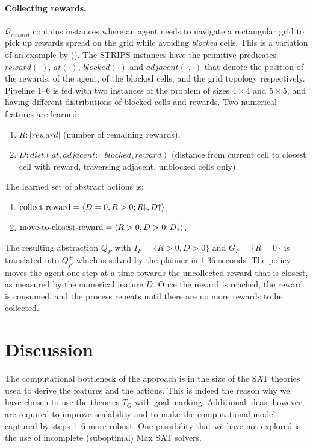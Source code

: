 \documentclass[letterpaper]{article} %
\newcommand{\tup}[1]{\langle #1 \rangle}
\newcommand{\abs}[1]{\ensuremath{\left\vert{#1}\right\vert}}
\newcommand{\citeay}[1]{\citeauthor{#1} (\citeyear{#1})}
\newcommand{\Q}{\mathcal{Q}}
\newcommand{\abst}[2]{\tup{#1;#2}}
\newcommand{\pplus}{\hspace{-.05em}\raisebox{.15ex}{\footnotesize$\uparrow$}}
\newcommand{\mminus}{\hspace{-.05em}\raisebox{.15ex}{\footnotesize$\downarrow$}}
\begin{document}
\paragraph{Collecting rewards.}
$\Q_{reward}$ contains instances where  an agent needs to navigate a rectangular
grid to pick up  rewards spread on the grid  while 
avoiding \emph{blocked} cells. This is a variation of an
example  by \citeay{garnelo2016towards}.
The STRIPS instances have the primitive predicates $reward(\cdot)$, $at(\cdot)$, $blocked(\cdot)$
and $adjacent(\cdot,\cdot)$ that denote the position of the rewards, of
the agent, of the blocked cells, and the grid topology respectively.
Pipeline 1--6  is fed with two instances of the problem of sizes $4 \times 4$
and $5\times 5$, and having different distributions of blocked cells and rewards.
Two numerical features are learned:
\begin{enumerate}[--]
  \item $R: \abs{reward}$ (number of remaining rewards), 
  \item $D:\! dist(at, adjacent{:}\neg blocked, reward)$ (distance from current
    cell to closest cell with reward, traversing adjacent, unblocked cells only).
\end{enumerate}
The learned set of abstract actions is:
\begin{enumerate}[--]
  \item $\text{collect-reward} = \abst{D=0, R > 0}{R\mminus, D\pplus}$,
  \item $\text{move-to-closest-reward} = \abst{R>0, D>0}{D\mminus}$.
\end{enumerate}

The resulting  abstraction $Q_F$ with $I_F = \{ R>0, D>0 \}$ and $G_F=\{R=0\}$
is translated into $Q^+_F$ which is solved by the planner in 1.36 seconds.
The policy moves the agent one step at a time towards the uncollected reward
that is closest, as measured by the numerical feature $D$. Once the reward is
reached, the reward is consumed, and the process repeats until there are no
more rewards to be collected. 


\section{Discussion}

The computational  bottleneck of the approach
is  in the size of the SAT  theories used to derive the features
and the actions.
This is indeed the reason why we have chosen to use the theories $T_G$
with goal marking. Additional ideas, however, are required
to improve scalability and to make the computational model
captured by  steps 1--6 more robust. One possibility that we have not explored
is the use of incomplete (suboptimal) Max SAT solvers. 
\end{document}
